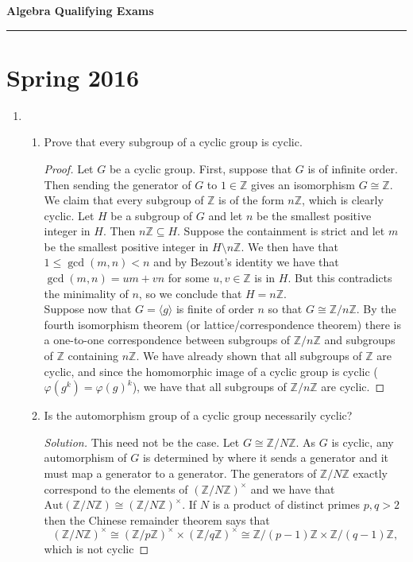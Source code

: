 \documentclass[11pt,letterpaper]{report}
\newcommand{\integers}{\mathbb{Z}}
\newcommand{\Aut}{\text{Aut}}
\newenvironment{solution}
{\begin{proof}[Solution]}
{\end{proof}}
\begin{document}
\begin{center}
{\bf \Large Algebra Qualifying Exams} %
\vspace{0.2cm}
\hrule
\end{center}

\section{Spring 2016}
\begin{enumerate}
	\item 
	\begin{enumerate}
		\item Prove that every subgroup of a cyclic group is cyclic.
		\begin{proof}
			Let $G$ be a cyclic group. First, suppose that $G$ is of infinite order. Then sending the generator of $G$ to $1\in \integers$ gives an isomorphism $G\cong \integers$. We claim that every subgroup of $\integers$ is of the form $n\integers$, which is clearly cyclic. Let $H$ be a subgroup of $G$ and let $n$ be the smallest positive integer in $H$. Then $n\integers \subseteq H$. Suppose the containment is strict and let $m$ be the smallest positive integer in $H\setminus n\integers$. We then have that $1\leq \gcd(m,n)<n$ and by Bezout's identity we have that $\gcd(m,n) = um+vn$ for some $u,v\in \integers$ is in $H$. But this contradicts the minimality of $n$, so we conclude that $H= n\integers$.\\

			\noindent Suppose now that $G = \langle g\rangle$ is finite of order $n$ so that $G\cong \integers/n\integers$. By the fourth isomorphism theorem (or lattice/correspondence theorem) there is a one-to-one correspondence between subgroups of $\integers/n\integers$ and subgroups of $\integers$ containing $n\integers$. We have already shown that all subgroups of $\integers$ are cyclic, and since the homomorphic image of a cyclic group is cyclic ($\varphi(g^k) = \varphi(g)^k$), we have that all subgroups of $\integers/n\integers$ are cyclic.
		\end{proof}

		\item Is the automorphism group of a cyclic group necessarily cyclic?
		\begin{solution}
			This need not be the case. Let $G \cong \integers/N\integers$. As $G$ is cyclic, any automorphism of $G$ is determined by where it sends a generator and it must map a generator to a generator. The generators of $\integers/N\integers$ exactly correspond to the elements of $(\integers/N\integers)^\times$ and we have that $\Aut(\integers/N\integers) \cong (\integers/N\integers)^\times$. If $N$ is a product of distinct primes $p, q>2$ then the Chinese remainder theorem says that
			\[
			(\integers/N\integers)^\times \cong (\integers/p\integers)^\times \times (\integers/q\integers)^\times \cong \integers/(p-1)\integers \times \integers/(q-1)\integers,
			\]
			which is not cyclic
		\end{solution}
	\end{enumerate}


\end{enumerate}
\end{document}
